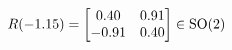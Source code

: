 \documentclass[preview]{standalone}
\begin{document}
\begin{align*}
\special{dvisvgm:raw <g id='unique000'>}R(-1.15) = \begin{bmatrix} 0.40 & 0.91 \\ -0.91 & 0.40 \end{bmatrix} \in \text{SO}(2)\special{dvisvgm:raw </g>}
\end{align*}
\end{document}
